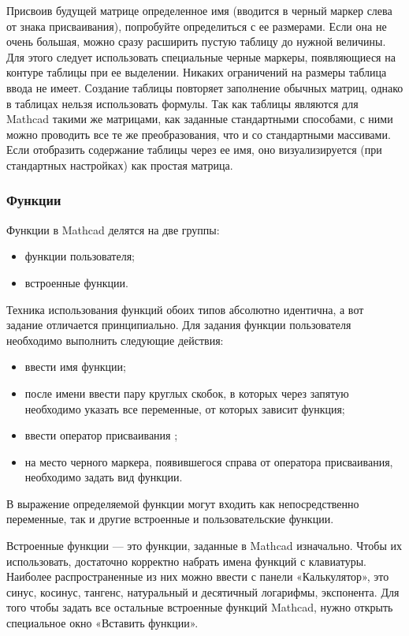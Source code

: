 Присвоив будущей матрице определенное имя (вводится в черный маркер слева от знака присваивания), попробуйте определиться с ее размерами. Если она не очень большая, можно сразу расширить пустую таблицу до нужной величины. Для этого следует использовать специальные черные маркеры, появляющиеся на контуре таблицы при ее выделении. Никаких ограничений на размеры таблица ввода не имеет. Создание таблицы повторяет заполнение обычных матриц, однако в таблицах нельзя использовать формулы.
Так как таблицы являются для Mathcad такими же матрицами, как заданные стандартными способами, с ними можно проводить все те же преобразования, что и со стандартными массивами. Если отобразить содержание таблицы через ее имя, оно визуализируется (при стандартных настройках) как простая матрица.

\subsubsection*{Функции}
Функции в Mathcad делятся на две группы:
\begin{itemize}
\item функции пользователя;
\item встроенные функции.
\end{itemize}
Техника использования функций обоих типов абсолютно идентична, а вот задание отличается принципиально. Для задания функции пользователя необходимо выполнить следующие действия:
\begin{itemize}
	\item ввести имя функции;
	\item после имени ввести пару круглых скобок, в которых через запятую необходимо указать все переменные, от которых зависит функция;
	\item ввести оператор присваивания \mc{:=};
	\item на место черного маркера, появившегося справа от оператора присваивания, необходимо задать вид функции.
\end{itemize}

В выражение определяемой функции могут входить как непосредственно переменные, так и другие встроенные и пользовательские функции. 

Встроенные функции --- это функции, заданные в Mathcad изначально. Чтобы их использовать, достаточно корректно набрать имена функций с клавиатуры. Наиболее распространенные из них можно ввести с панели «Калькулятор», это синус, косинус, тангенс, натуральный и десятичный логарифмы, экспонента. Для того чтобы задать все остальные встроенные функций Mathcad, нужно открыть специальное окно «Вставить функции».


